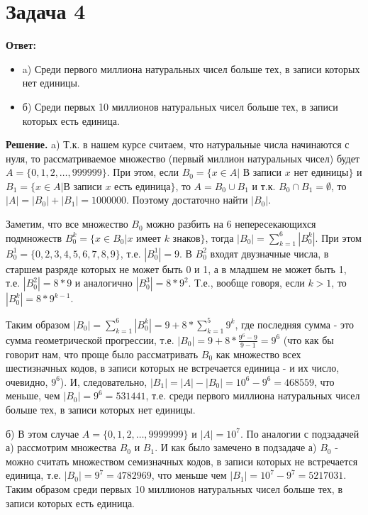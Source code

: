 \documentclass{article}
\begin{document}
\section*{Задача 4}
{\bf Ответ:}
\begin{itemize}
\item a) Среди первого миллиона натуральных чисел больше тех, в записи которых нет единицы.
\item б) Среди первых 10 миллионов натуральных чисел больше тех, в записи которых есть единица.
\end{itemize}
{\bf Решение. } a) Т.к. в нашем курсе считаем, что натуральные числа начинаются с нуля, то рассматриваемое множество (первый миллион натуральных чисел) будет $A=\{0, 1, 2, \dots, 999999\}$. При этом, если $B_0=\{x \in A|$ В записи $x$ нет единицы$\}$ и $B_1=\{x \in A|$В записи $x$ есть единица$\}$, то
$A=B_0 \cup B_1$ и т.к. $B_0 \cap B_1 = \emptyset$, то $|A| = |B_0| + |B_1| = 1000000$. Поэтому достаточно найти $|B_0|$.
\par
Заметим, что все множество $B_0$ можно разбить на 6 непересекающихся подмножеств $B_0^k=\{x \in B_0| x$ имеет $k$ знаков$\}$, тогда $|B_0|=\sum_{k=1}^6|B_0^k|$. При этом $B_0^1=\{0,2,3,4,5,6,7,8,9\}$, т.е. $|B_0^1|=9$. В $B_0^2$ входят двузначные числа, в старшем разряде которых не может быть 0 и 1, а в младшем не может быть 1, т.е. $|B_0^2|=8*9$ и аналогично $|B_0^3|=8*9^2$. Т.е., вообще говоря, если $k > 1$, то $|B_0^k|=8*9^{k-1}$.
\par
Таким образом $|B_0|=\sum_{k=1}^6|B_0^k|=9+8*\sum_{k=1}^5 9^k$, где последняя сумма - это сумма геометрической прогрессии, т.е. $|B_0|=9+8*\frac{9^6-9}{9-1}=9^6$ (что как бы говорит нам, что проще было рассматривать $B_0$ как множество всех шестизначных кодов, в записи которых не встречается единица - и их число, очевидно, $9^6$). И, следовательно, $|B_1|=|A|-|B_0|=10^6-9^6=468559$, что меньше, чем $|B_0|=9^6=531441$, т.е. среди первого миллиона натуральных чисел больше тех, в записи которых нет единицы.
\par
 б) В этом случае $A=\{0,1,2,\dots,9999999\}$ и $|A|=10^7$. По аналогии с подзадачей а) рассмотрим множества $B_0$ и $B_1$. И как было замечено в подзадаче а) $B_0$ - можно считать множеством семизначных кодов, в записи которых не встречается единица, т.е. $|B_0|=9^7=4782969$, что меньше чем $|B_1|=10^7-9^7=5217031$.
Таким образом среди первых 10 миллионов натуральных чисел больше тех, в записи которых есть единица.
\end{document}
